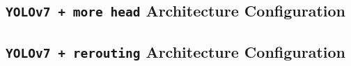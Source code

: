 \chapter{}
\section*{\texttt{YOLOv7 + more head} Architecture Configuration}

\section*{\texttt{YOLOv7 + rerouting} Architecture Configuration}
